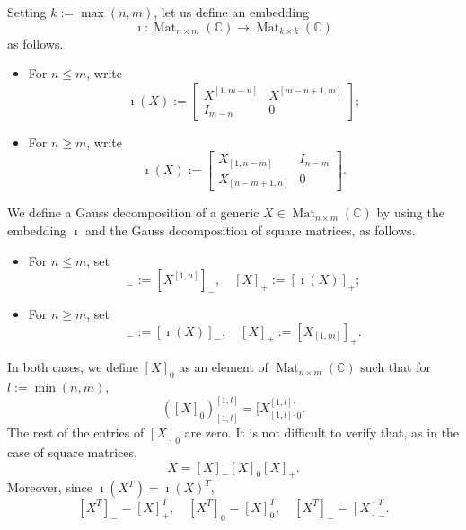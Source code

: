 \documentclass[11pt]{article}
\DeclareMathOperator{\Mat}{Mat}
\theoremstyle{definition}\newtheorem{definition}[theorem]{Definition}
\theoremstyle{definition}\newtheorem{remark}[theorem]{Remark}
\theoremstyle{remark}
\numberwithin{equation}{section}
\begin{document}
Setting $k:=\max(n,m)$, let us define an embedding
\begin{equation*}
    \imath : \Mat_{n\times m}(\mathbb{C}) \rightarrow \Mat_{k\times k}(\mathbb{C})
\end{equation*}
as follows.
\begin{itemize}
    \item For $n \leq m$, write
    \begin{equation*}
        \imath(X) := \begin{bmatrix}
            X^{[1,m-n]} & X^{[m-n+1,m]} \\
            I_{m-n} & 0
        \end{bmatrix};
    \end{equation*}
    \item For $n \geq m$, write
    \begin{equation*}
        \imath(X) := \begin{bmatrix}
            X_{[1,n-m]} & I_{n-m}\\
            X_{[n-m+1,n]} & 0
        \end{bmatrix}.
    \end{equation*}
\end{itemize}
We define a Gauss decomposition of a generic $X \in \Mat_{n\times m}(\mathbb{C})$ by using the embedding $\imath$ and the Gauss decomposition of square matrices, as follows.
\begin{itemize}
    \item For $n \leq m$, set
    \begin{equation*}
        [X]_- := [X^{[1,n]}]_-, \quad [X]_+ := [\imath(X)]_+;
    \end{equation*}
    \item For $n \geq m$, set
    \begin{equation*}
        [X]_- := [\imath(X)]_-, \quad [X]_+ := [X_{[1,m]}]_+.
    \end{equation*}
\end{itemize}
In both cases, we define $[X]_0$ as an element of $\Mat_{n\times m}(\mathbb{C})$ such that for $l:=\min(n,m)$,
\begin{equation*}
    ([X]_0)_{[1,l]}^{[1,l]} = \big[X^{[1,l]}_{[1,l]}\big]_0.
\end{equation*}
The rest of the entries of $[X]_0$ are zero. It is not difficult to verify that, as in the case of square matrices,
\begin{equation*}
    X = [X]_- [X]_0 [X]_+.
\end{equation*}
Moreover, since $\imath(X^T) = \imath(X)^T$, 
\begin{equation}\label{eq:transpose_gauss}
    [X^T]_- = [X]_+^T, \quad [X^T]_0 = [X]_0^T, \quad [X^T]_+ = [X]_-^T.
\end{equation}
\end{document}

